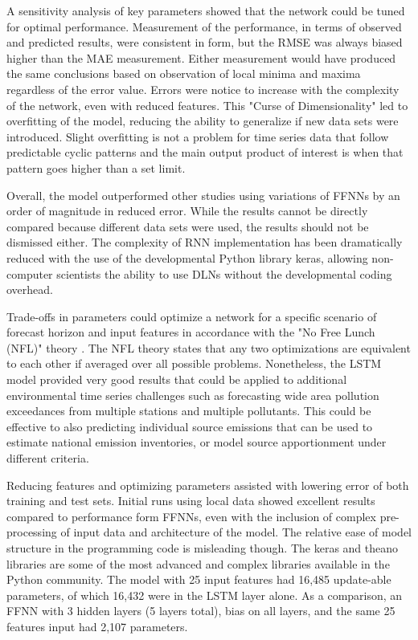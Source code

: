 \documentclass[preprint,12pt,authoryear]{elsarticle}
\begin{document}
\begin{linenumbers}
A sensitivity analysis of key parameters showed that the network could be tuned for optimal performance. Measurement of the performance, in terms of observed and predicted results, were consistent in form, but the RMSE was always biased higher than the MAE measurement. Either measurement would have produced the same conclusions based on observation of local minima and maxima regardless of the error value. Errors were notice to increase with the complexity of the network, even with reduced features. This "Curse of Dimensionality" led to overfitting of the model, reducing the ability to generalize if new data sets were introduced. Slight overfitting is not a problem for time series data that follow predictable cyclic patterns and the main output product of interest is when that pattern goes higher than a set limit.

Overall, the model outperformed other studies using variations of FFNNs by an order of magnitude in reduced error. While the results cannot be directly compared because different data sets were used, the results should not be dismissed either. The complexity of RNN implementation has been dramatically reduced with the use of the developmental Python library keras, allowing non-computer scientists the ability to use DLNs without the developmental coding overhead.

Trade-offs in parameters could optimize a network for a specific scenario of forecast horizon and input features in accordance with the "No Free Lunch (NFL)" theory \citep{Wolpert1997}. The NFL theory states that any two optimizations are equivalent to each other if averaged over all possible problems. Nonetheless, the LSTM model provided very good results that could be applied to additional environmental time series challenges such as forecasting wide area pollution exceedances from multiple stations and multiple pollutants. This could be effective to also predicting individual source emissions that can be used to estimate national emission inventories, or model source apportionment under different criteria. 

Reducing features and optimizing parameters assisted with lowering error of both training and test sets. Initial runs using local data showed excellent results compared to performance form FFNNs, even with the inclusion of complex pre-processing of input data and architecture of the model. The relative ease of model structure in the programming code is misleading though. The keras and theano libraries are some of the most advanced and complex libraries available in the Python community. The model with 25 input features had 16,485 update-able parameters, of which 16,432 were in the LSTM layer alone.  As a comparison, an FFNN with 3 hidden layers (5 layers total), bias on all layers, and the same 25 features input had 2,107 parameters.


\end{linenumbers}
\end{document}
